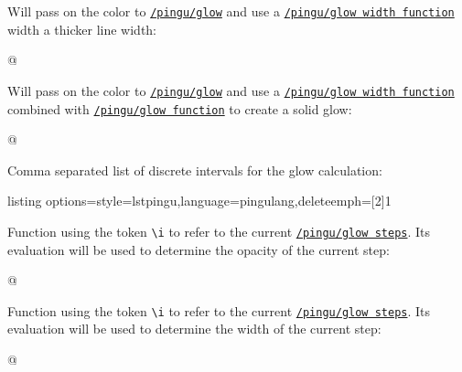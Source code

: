 \documentclass[parskip=half,english,numbers=noenddot,footnotes=nomultiple,oneside]{scrartcl}
\makeatletter
\def\lpingu#1{\lstinline[style=lstpingu,language=pingulang]'#1'}
\edef\i{\number\count@}\relax
\newcommand*\keyref[2][/pingu/]{\hyperref[pk:#1#2]{\lpingu{#1#2}}}
\makeatother
\begin{document}
Will pass on the color to \keyref{glow} and use a \keyref{glow width function} width a thicker line width:
\begin{tcblisting}{@}
\begin{tikzpicture}
	\pingu[glow thick=green]
\end{tikzpicture}
\end{tcblisting}
\endkeyexplain

Will pass on the color to \keyref{glow} and use a \keyref{glow width function} combined with \keyref{glow function} to create a solid glow:
\begin{tcblisting}{@}
\begin{tikzpicture}
	\pingu[glow solid=green, wings wave]
\end{tikzpicture}
\end{tcblisting}
\endkeyexplain

	Comma separated list of discrete intervals for the glow calculation:
\begin{tcblisting}{listing options={style=lstpingu,language=pingulang,deleteemph={[2]{1}}}}
\begin{tikzpicture}
	\pingu[glow=green, glow steps={.3,.5,1}]
\end{tikzpicture}
\end{tcblisting}
\endsubkeyexplain

{\def\i{\textbackslash i~}%
	Function using the token \lpingu{\i} to refer to the current \keyref{glow steps}. Its evaluation will be used to determine the opacity of the current step:
\begin{tcblisting}{@}
\begin{tikzpicture}
	\pingu[glow=green,
	       glow function={.5/\i}]
\end{tikzpicture}
\end{tcblisting}
\endsubkeyexplain}

{\def\i{\textbackslash i~}%
	Function using the token \lpingu{\i} to refer to the current \keyref{glow steps}. Its evaluation will be used to determine the width of the current step:
\begin{tcblisting}{@}
\begin{tikzpicture}
	\pingu[glow=green,
	  glow width function={5mm-\i mm}]
\end{tikzpicture}
\end{tcblisting}
\endsubkeyexplain}
\end{document}
